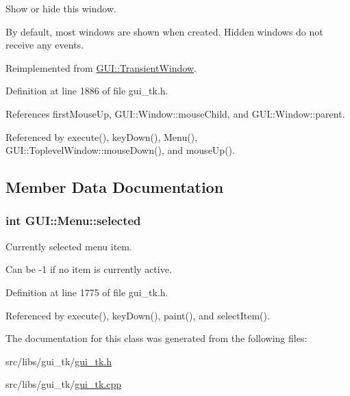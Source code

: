 Show or hide this window. 

By default, most windows are shown when created. Hidden windows do not receive any events. 

Reimplemented from \hyperlink{classGUI_1_1TransientWindow_a5581ee490ae2ce490ca45e234f6712a2}{G\-U\-I\-::\-Transient\-Window}.



Definition at line 1886 of file gui\-\_\-tk.\-h.



References first\-Mouse\-Up, G\-U\-I\-::\-Window\-::mouse\-Child, and G\-U\-I\-::\-Window\-::parent.



Referenced by execute(), key\-Down(), Menu(), G\-U\-I\-::\-Toplevel\-Window\-::mouse\-Down(), and mouse\-Up().



\subsection{Member Data Documentation}
\hypertarget{classGUI_1_1Menu_a6934c1ce59c87dc59630390e8fb37e1a}{
\subsubsection[{selected}]{\setlength{\rightskip}{0pt plus 5cm}int {\bf G\-U\-I\-::\-Menu\-::selected}}}\label{classGUI_1_1Menu_a6934c1ce59c87dc59630390e8fb37e1a}


Currently selected menu item. 

Can be -\/1 if no item is currently active. 

Definition at line 1775 of file gui\-\_\-tk.\-h.



Referenced by execute(), key\-Down(), paint(), and select\-Item().



The documentation for this class was generated from the following files\-:\begin{DoxyCompactItemize}
\item 
src/libs/gui\-\_\-tk/\hyperlink{gui__tk_8h}{gui\-\_\-tk.\-h}\item 
src/libs/gui\-\_\-tk/\hyperlink{gui__tk_8cpp}{gui\-\_\-tk.\-cpp}\end{DoxyCompactItemize}
